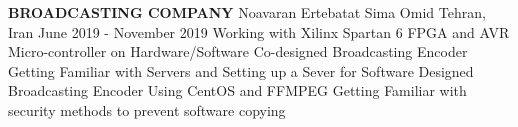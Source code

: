 \begin{cventries}
	
    \cventry
    {\textbf{BROADCASTING COMPANY}}
    {Noavaran Ertebatat Sima Omid}
    {Tehran, Iran}
    {June 2019 - November 2019}
    {Working with Xilinx Spartan 6 FPGA and AVR Micro-controller on Hardware/Software Co-designed Broadcasting Encoder \newline Getting Familiar with Servers and Setting up a Sever for Software Designed Broadcasting Encoder Using CentOS and FFMPEG \newline Getting Familiar with security methods to prevent software copying}   
    
\end{cventries}

